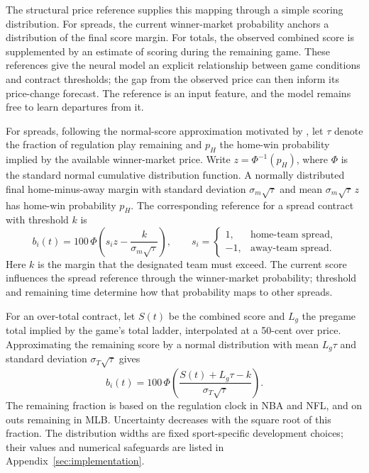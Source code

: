 \documentclass[12pt,a4paper,oneside]{report}
\begin{document}
The structural price reference supplies this mapping through a simple scoring
distribution. For spreads, the current winner-market probability anchors a
distribution of the final score margin. For totals, the observed combined score
is supplemented by an estimate of scoring during the remaining game. These
references give the neural model an explicit relationship between game
conditions and contract thresholds; the gap from the observed price can then
inform its price-change forecast. The reference is an input feature, and the
model remains free to learn departures from it.

For spreads, following the normal-score approximation motivated by \citet{stern1994brownian},
let $\tau$ denote the fraction of regulation play remaining and $p_H$ the
home-win probability implied by the available winner-market price. Write
$z=\Phi^{-1}(p_H)$, where $\Phi$ is the standard normal cumulative distribution
function. A normally distributed final home-minus-away margin with standard
deviation $\sigma_m\sqrt{\tau}$ and mean $\sigma_m\sqrt{\tau}\,z$ has home-win
probability $p_H$. The corresponding reference for a spread contract with threshold $k$ is
\begin{equation}
 b_i(t)=100\,\Phi\!\left(s_i z-\frac{k}{\sigma_m\sqrt{\tau}}\right),
 \qquad
 s_i=\begin{cases}1,&\text{home-team spread},\\-1,&\text{away-team spread}.
 \end{cases}
 \label{eq:spread-reference}
\end{equation}
Here $k$ is the margin that the designated team must exceed. The current score
influences the spread reference through the winner-market probability; threshold
and remaining time determine how that probability maps to other spreads.

For an over-total contract, let $S(t)$ be the combined score and $L_g$ the
pregame total implied by the game's total ladder, interpolated at a 50-cent over
price. Approximating the remaining score by a normal distribution with mean
$L_g\tau$ and standard deviation $\sigma_T\sqrt{\tau}$ gives
\begin{equation}
 b_i(t)=100\,\Phi\!\left(
 \frac{S(t)+L_g\tau-k}{\sigma_T\sqrt{\tau}}\right).
 \label{eq:total-reference}
\end{equation}
The remaining fraction is based on the regulation clock in NBA and NFL, and on
outs remaining in MLB. Uncertainty decreases with the square root of this
fraction. The distribution widths are fixed sport-specific development choices;
their values and numerical safeguards are listed in
Appendix~\ref{sec:implementation}.
\end{document}
